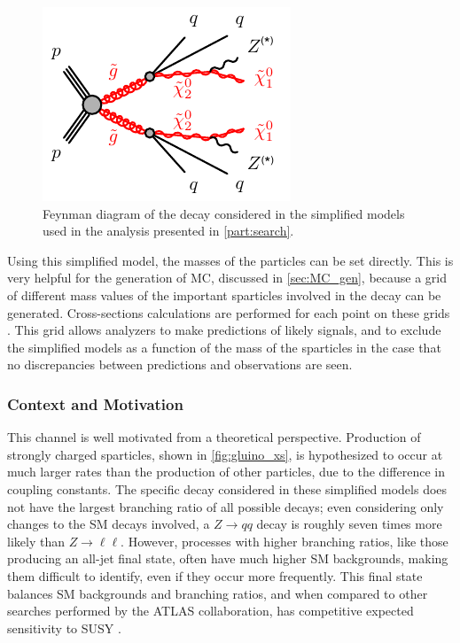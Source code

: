 \begin{centering}
\begin{figure}[!hbt]
\myfloatalign
\includegraphics[width=.9\linewidth]{figures/theory/gogo-qqqqZZN1N1.pdf}
\caption{Feynman diagram of the decay considered in the simplified models used in the analysis presented in \autoref{part:search}.}
\label{fig:simpmodel}
\end{figure}
\end{centering}

Using this simplified model, the masses of the particles can be set directly. This is very helpful for the generation of \ac{MC}, discussed in \autoref{sec:MC_gen}, because a grid of different mass values of the important sparticles involved in the decay can be generated. Cross-sections calculations are performed for each point on these grids \cite{1105.1110}. This grid allows analyzers to make predictions of likely signals, and to exclude the simplified models as a function of the mass of the sparticles in the case that no discrepancies between predictions and observations are seen. 


\subsubsection{Context and Motivation}

This channel is well motivated from a theoretical perspective. Production of strongly charged sparticles, shown in \autoref{fig:gluino_xs}, is hypothesized to occur at much larger rates than the production of other particles, due to the difference in coupling constants. The specific decay considered in these simplified models does not have the largest branching ratio of all possible decays; even considering only changes to the \ac{SM} decays involved, a $Z\rightarrow qq$ decay is roughly seven times more likely than $Z\rightarrow\ell\ell$. However, processes with higher branching ratios, like those producing an all-jet final state, often have much higher \ac{SM} backgrounds, making them difficult to identify, even if they occur more frequently. This final state balances \ac{SM} backgrounds and branching ratios, and when compared to other searches performed by the \ac{ATLAS} collaboration, has competitive expected sensitivity to \ac{SUSY} \cite{summary_plot}. 

